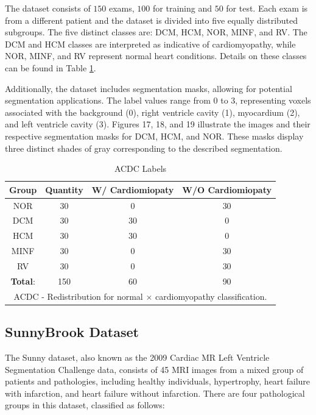 \documentclass[journal,twoside,web]{ieeecolor}
\begin{document}
The dataset consists of $150$ exams, $100$ for training and $50$ for test. Each exam is from a different patient and the dataset is divided into five equally distributed subgroups. The five distinct classes are: \gls{DCM}, \gls{HCM}, \gls{NOR}, \gls{MINF}, and \gls{RV}. The \gls{DCM} and \gls{HCM} classes are interpreted as indicative of cardiomyopathy, while \gls{NOR}, \gls{MINF}, and \gls{RV} represent normal heart conditions. Details on these classes can be found in Table \ref{table01}.  

Additionally, the dataset includes segmentation masks, allowing for potential segmentation applications. The label values range from 0 to 3, representing voxels associated with the background (0), right ventricle cavity (1), myocardium (2), and left ventricle cavity (3). Figures 17, 18, and 19 illustrate the images and their respective segmentation masks for \gls{DCM}, \gls{HCM}, and NOR. These masks display three distinct shades of gray corresponding to the described segmentation.


\begin{table}[h]
\centering
\caption{ACDC Labels}
\label{table01}
\setlength{\tabcolsep}{4pt}
\begin{tabular}{|c|c|c|c|}
    \hline 
          \textbf{Group} & \textbf{Quantity} & \textbf{W/ Cardiomiopaty} & \textbf{W/O Cardiomiopaty}  \\ 
    \hline 
        NOR & 30 & 0 & 30 \\ 
        DCM & 30 & 30 & 0\\ 
        HCM & 30 & 30 & 0\\ 
        MINF & 30 & 0 & 30 \\ 
        RV & 30 & 0 & 30 \\
    \hline 
        \textbf{Total}: & 150  & 60 & 90\\ 
    \hline 
    \multicolumn{4}{p{230pt}}{ACDC - Redistribution for normal $\times$ cardiomyopathy classification. } \\
\end{tabular} 
\end{table}


\subsection{SunnyBrook Dataset}
The Sunny dataset, also known as the 2009 Cardiac MR Left Ventricle Segmentation Challenge data, consists of 45 MRI images from a mixed group of patients and pathologies, including healthy individuals, hypertrophy, heart failure with infarction, and heart failure without infarction. There are four pathological groups in this dataset, classified as follows:  
\end{document}
